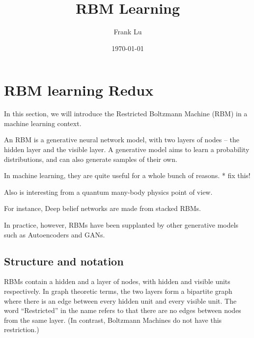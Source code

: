\documentclass[11pt]{article}
\author{Frank Lu}
\date{\today}
\title{RBM Learning}
\begin{document}
\maketitle
\tableofcontents

\newcommand{\kp}{\ket{\psi}}
\newcommand{\bp}{\bra{\psi}}
\newcommand{\tr}[1]{\textrm{tr}\left[{#1}\right]}
\newcommand{\U}{\mathcal{U}}

\newsavebox{\mybox}
\newenvironment{Notes}
{\begin{lrbox}{\mybox}\begin{minipage}{\textwidth}}
{\end{minipage}\end{lrbox}\fbox{\usebox{\mybox}}\\}


\newcommand{\nH}{n_H}
\newcommand{\nV}{n_V}
\newcommand{\NH}{N_H}
\newcommand{\NV}{N_V}

\newcommand{\ls}{l_1l_2 \dots l_{\nH}}
\newcommand{\ones}{1, 1, \dots, 1}
\newcommand{\ks}{k_1k_2 \dots k_{\nH}}

\newcommand{\R}{\mathbb{R}}


\newcommand\xv{\mathbf{x}}
\newcommand\hv{\mathbf{h}}
\newcommand\vv{\mathbf{v}}
\newcommand\rbm{\text{RBM}}

\section{RBM learning Redux}
\label{sec:org224318d}
In this section, we will introduce the Restricted Boltzmann Machine (RBM) in a machine learning context.

An RBM is a generative neural network model, with two layers of nodes -- the hidden layer and the visible layer.
A generative model aims to learn a probability distributions, and can also generate samples of their own.

In machine learning, they are quite useful for a whole bunch of reasons. * fix this!

Also is interesting from a quantum many-body physics point of view.


For instance, Deep belief networks are made from stacked RBMs.

In practice, however, RBMs have been supplanted by other generative models such as Autoencoders and GANs.


\subsection{Structure and notation}
\label{sec:org6219775}
RBMs contain a hidden and a layer of nodes, with hidden and visible units respectively.
In graph theoretic terms, the two layers form a bipartite graph where there is an edge between every hidden unit and every visible unit.
The word ``Restricted'' in the name refers to that there are no edges between nodes from the same layer. (In contrast, Boltzmann Machines do not have this restriction.)
\end{document}
